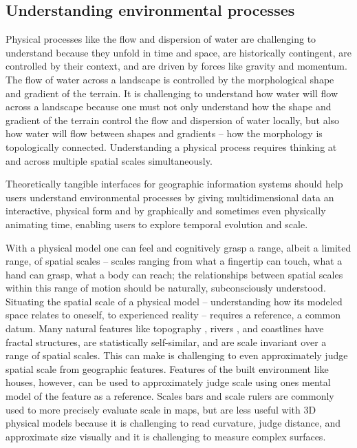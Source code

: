 \documentclass{article}
\begin{document}

\subsection{Understanding environmental processes}

Physical processes like the flow and dispersion of water are challenging to understand because they unfold in time and space, are historically contingent, are controlled by their context, and are driven by forces like gravity and momentum. The flow of water across a landscape is controlled by the morphological shape and gradient of the terrain. It is challenging to understand how water will flow across a landscape because one must not only understand how the shape and gradient of the terrain control the flow and dispersion of water locally, but also how water will flow between shapes and gradients – how the morphology is topologically connected. Understanding a physical process requires thinking at and across multiple spatial scales simultaneously. 

Theoretically tangible interfaces for geographic information systems should help users understand environmental processes
by giving multidimensional data an interactive, physical form 
and
by graphically and sometimes even physically animating time, enabling users to explore temporal evolution and scale.

With a physical model one can feel and cognitively grasp a range, albeit a limited range, of spatial scales 
-- scales ranging from what a fingertip can touch, what a hand can grasp, what a body can reach; 
the relationships between spatial scales within this range of motion 
should be naturally, subconsciously understood. 
%
Situating the spatial scale of a physical model  -- understanding how its modeled space relates to oneself, to experienced reality -- requires a reference, a common datum. 
%
Many natural features like topography \citep{Pelletier1996}, rivers \citep{Rodriguez-Iturbe1994,Tarboton1988}, and coastlines \citep{Mandelbrot1967} have fractal structures, are statistically self-similar, and are scale invariant over a range of spatial scales.
%
This can make is challenging to even approximately judge spatial scale from geographic features. 
Features of the built environment like houses, however, can be used to approximately judge scale 
using ones mental model of the feature as a reference. 
Scales bars and scale rulers are commonly used to more precisely evaluate scale in maps, 
but are less useful with 3D physical models 
because it is challenging to read curvature, judge distance, and approximate size visually
\citep{Howard2012b,Howard2012c, Jeannerod1997}
and it is challenging to measure complex surfaces. 
%
\end{document}
